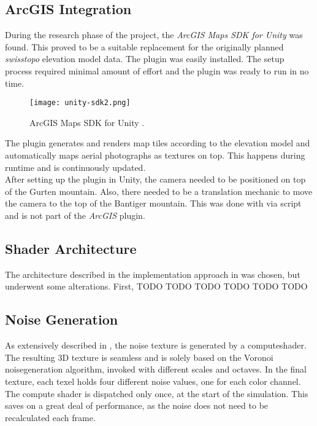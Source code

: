\clearpage

\subsection{ArcGIS Integration}
\label{section:techimpl:arcgis}
During the research phase of the project, the \emph{ArcGIS Maps SDK for Unity} \cite{arcgis:unitysdk} was found. This proved to be a suitable replacement for the originally planned \emph{swisstopo} elevation model data.
The plugin was easily installed. The setup process required minimal amount of effort and the plugin was ready to run in no time. 

\begin{figure}[H]
    \texttt{[image: unity-sdk2.png]}
    \caption{ArcGIS Maps SDK for Unity \protect\cite{arcgis:unitysdk}.}
\end{figure}

\noindent
The plugin generates and renders map tiles according to the elevation model and automatically maps aerial photographs as textures on top.
This happens during runtime and is continuously updated.
\\
After setting up the plugin in Unity, the camera needed to be positioned on top of the Gurten mountain. Also, there needed to be a translation mechanic to move the camera to the top of the Bantiger mountain.
This was done with via script and is not part of the \emph{ArcGIS} plugin.

\subsection{Shader Architecture}
\label{section:techimpl:architecture}
The architecture described in the implementation approach in  was chosen, but underwent some alterations.
First, 
TODO
TODO
TODO
TODO
TODO
TODO

\subsection{Noise Generation}
\label{section:techimpl:noise}
As extensively described in , the \gls{noise} texture is generated by a \gls{computeshader}.
The resulting 3D texture is seamless and is solely based on the Voronoi \gls{noisegeneration} algorithm, invoked with different scales and octaves.
In the final texture, each \gls{texel} holds four different \gls{noise} values, one for each color channel.
\\
The compute shader is dispatched only once, at the start of the simulation. This saves on a great deal of performance, as the \gls{noise} does not need to be recalculated each frame.

